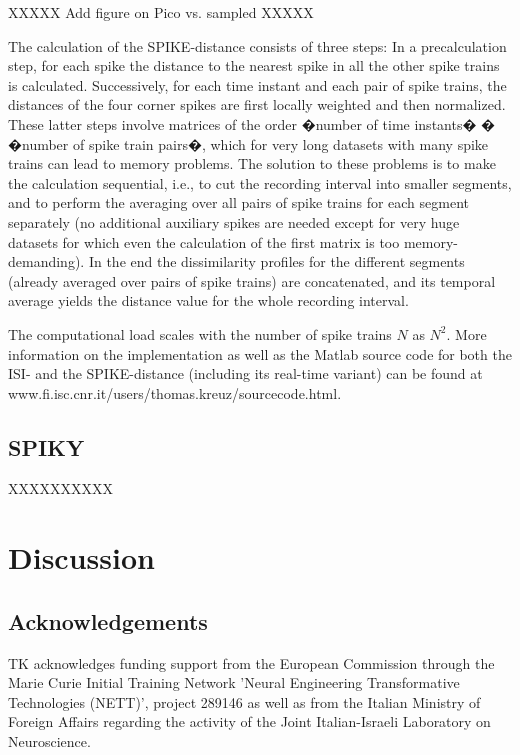 \documentclass[10pt,twocolumn]{elsart5p}
\begin{document}
XXXXX Add figure on Pico vs. sampled XXXXX

The calculation of the SPIKE-distance consists of three steps: In a precalculation step, for each spike the distance to
the nearest spike in all the other spike trains is calculated. Successively, for each time instant and each pair of spike
trains, the distances of the four corner spikes are first locally weighted and then normalized. These latter steps involve
matrices of the order �number of time instants� � �number of spike train pairs�, which for very long datasets with many
spike trains can lead to memory problems. The solution to these problems is to make the calculation sequential, i.e.,
to cut the recording interval into smaller segments, and to perform the averaging over all pairs of spike trains for
each segment separately (no additional auxiliary spikes are needed except for very huge datasets for which even the calculation
of the first matrix is too memory-demanding). In the end the dissimilarity profiles for the different segments (already averaged over pairs of spike trains) are concatenated, and its temporal average yields the distance value for the whole recording interval.

The computational load scales with the number of spike trains $N$ as $N^2$. More information on the implementation as well as the Matlab source code for both the ISI- and the SPIKE-distance (including its real-time variant) can be found at www.fi.isc.cnr.it/users/thomas.kreuz/sourcecode.html.




\subsection{\label{ss:SPIKY} SPIKY}

XXXXXXXXXX


\section{\label{s:Discussion} Discussion}




\begin{appendix} \label{Appendix}

\end{appendix}


\vspace{1cm}

\begin{thanks}
\section{\label{s:Acknowledgement} \textbf{Acknowledgements}}
     TK acknowledges funding support from the European Commission through the Marie Curie Initial Training Network 'Neural Engineering Transformative Technologies (NETT)', project 289146 as well as from the Italian Ministry of Foreign Affairs regarding the activity of the Joint Italian-Israeli Laboratory on Neuroscience.
\end{thanks}




%

\end{document}
